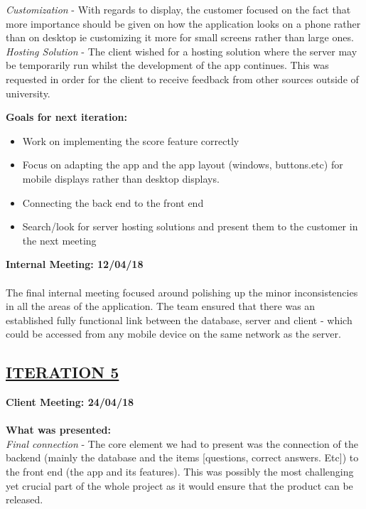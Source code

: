 \documentclass[paper=a4,fontsize=11pt]{article}
\newcommand{\sepspace}{\vspace*{1em}}		%
\newcommand{\SectionPart}[1]{\subsection*{\uppercase{#1}}}
\begin{document}
\noindent
\textit{Customization} -
With regards to display, the customer focused on the fact that more importance should be
given on how the application looks on a phone rather than on desktop ie customizing it more
for small screens rather than large ones.\\

\noindent
\textit{Hosting Solution} -
The client wished for a hosting solution where the server may be temporarily run whilst the
development of the app continues. This was requested in order for the client to receive feedback
from other sources outside of university.\\
\sepspace

\noindent
\textbf{Goals for next iteration:}
\begin{itemize}
	\item Work on implementing the score feature correctly
	\item Focus on adapting the app and the app layout (windows, buttons.etc) for mobile displays rather than desktop displays.
	\item Connecting the back end to the front end
	\item Search/look for server hosting solutions and present them to the customer in the next meeting
\end{itemize}
\sepspace

\hfill \textbf{Internal Meeting: 12/04/18}\\
\\
\noindent
The final internal meeting focused around polishing up the minor inconsistencies in all the
areas of the application. The team ensured that there was an established fully functional link between
the database, server and client - which could be accessed from any mobile device on the same network
as the server.\\
\sepspace

\SectionPart{\ul{Iteration 5}}
\hfill \textbf{Client Meeting: 24/04/18} \\
\\
\textbf{What was presented:}\\
\noindent
\textit{Final connection} -
The core element we had to present was the connection of the backend (mainly the database
and the items [questions, correct answers. Etc]) to the front end (the app and its features).
This was possibly the most challenging yet crucial part of the whole project as it would
ensure that the product can be released.\\
\end{document}
